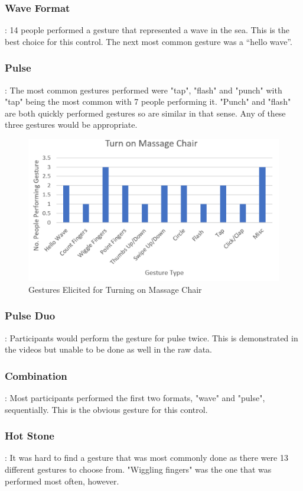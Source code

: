 \documentclass{l4proj}
\begin{document}
\subsubsection{Wave Format}: 14 people performed a gesture that represented a wave in the sea. This is the best choice for this control. The next most common gesture was a “hello wave”.
\subsubsection{Pulse}: The most common gestures performed were "tap", "flash" and "punch" with "tap" being the most common with 7 people performing it. "Punch" and "flash" are both quickly performed gestures so are similar in that sense. Any of these three gestures would be appropriate.
\begin{figure}[!htb]
    \centering
    \includegraphics[scale=0.8]{images/massageChair.png}
    \caption{Gestures Elicited for Turning on Massage Chair}
    \label{fig:massageChair}
\end{figure}
\subsubsection{Pulse Duo}: Participants would perform the gesture for pulse twice. This is demonstrated in the videos but unable to be done as well in the raw data.
\subsubsection{Combination}: Most participants performed the first two formats, "wave" and "pulse", sequentially. This is the obvious gesture for this control.
\subsubsection{Hot Stone}: It was hard to find a gesture that was most commonly done as there were 13 different gestures to choose from. "Wiggling fingers" was the one that was performed most often, however. 
\end{document}
